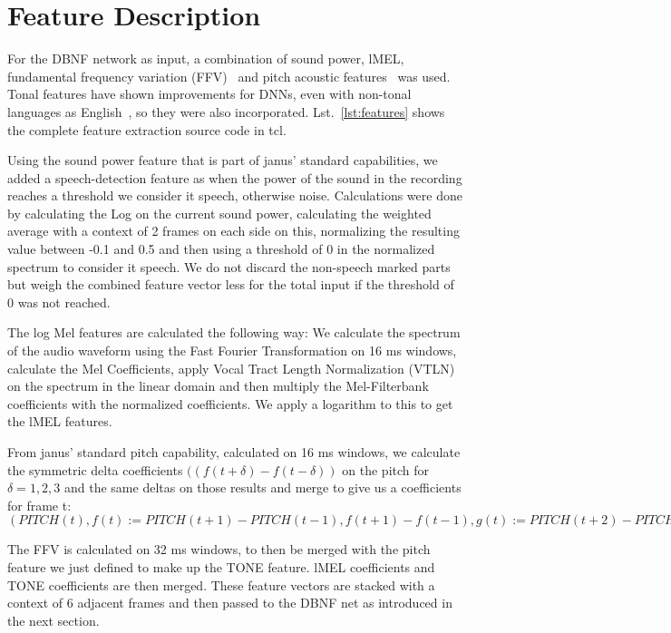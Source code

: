 \section{Feature Description}
\label{sec:FP:FD}
For the DBNF network as input, a combination of sound power, lMEL, fundamental frequency variation (FFV)~\cite{laskowski2008fundamental} and pitch acoustic features~\cite{schubert1999grundfrequenzverfolgung} was used. Tonal features have shown improvements for DNNs, even with non-tonal languages as English~\cite{metze2013models}, so they were also incorporated. Lst.~\ref{lst:features} shows the complete feature extraction source code in tcl.

Using the sound power feature that is part of janus' standard capabilities, we added a speech-detection feature as when the power of the sound in the recording reaches a threshold we consider it speech, otherwise noise. Calculations were done by calculating the Log on the current sound power, calculating the weighted average with a context of 2 frames on each side on this, normalizing the resulting value between -0.1 and 0.5 and then using a threshold of 0 in the normalized spectrum to consider it speech. We do not discard the non-speech marked parts but weigh the combined feature vector less for the total input if the threshold of 0 was not reached.  

The log Mel features are calculated the following way: We calculate the spectrum of the audio waveform using the Fast Fourier Transformation on 16 ms windows, calculate the Mel Coefficients, apply Vocal Tract Length Normalization (VTLN) on the spectrum in the linear domain and then multiply the Mel-Filterbank coefficients with the normalized coefficients. We apply a logarithm to this to get the lMEL features.

From janus' standard pitch capability, calculated on 16 ms windows, we calculate the symmetric delta coefficients \(((f(t+\delta) - f(t-\delta))\) on the pitch for \(\delta=1,2,3\) and the same deltas on those results and merge to give us a coefficients for frame t:
\((PITCH(t), f(t):=PITCH(t+1)-PITCH(t-1),f(t+1)-f(t-1),g(t):=PITCH(t+2)-PITCH(t-2),g(t+2)-g(t-2),h(t):=PITCH(t+3)-PITCH(t-3),h(t+3)-h(t-3))\)

The FFV is calculated on 32 ms windows, to then be merged  with the pitch feature we just defined to make up the TONE feature. lMEL coefficients and TONE coefficients are then merged. These feature vectors are stacked with a context of 6 adjacent frames and then passed to the DBNF net as introduced in the next section.
